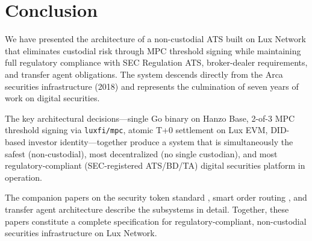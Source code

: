 \section{Conclusion}


We have presented the architecture of a non-custodial ATS built on Lux Network that eliminates custodial risk through MPC threshold signing while maintaining full regulatory compliance with SEC Regulation ATS, broker-dealer requirements, and transfer agent obligations. The system descends directly from the Arca securities infrastructure (2018) and represents the culmination of seven years of work on digital securities.

The key architectural decisions---single Go binary on Hanzo Base, 2-of-3 MPC threshold signing via \texttt{luxfi/mpc}, atomic T+0 settlement on Lux EVM, DID-based investor identity---together produce a system that is simultaneously the safest (non-custodial), most decentralized (no single custodian), and most regulatory-compliant (SEC-registered ATS/BD/TA) digital securities platform in operation.

The companion papers on the security token standard \cite{lux-security-token-standard}, smart order routing \cite{lux-smart-order-routing}, and transfer agent architecture \cite{lux-transfer-agent} describe the subsystems in detail. Together, these papers constitute a complete specification for regulatory-compliant, non-custodial securities infrastructure on Lux Network.

